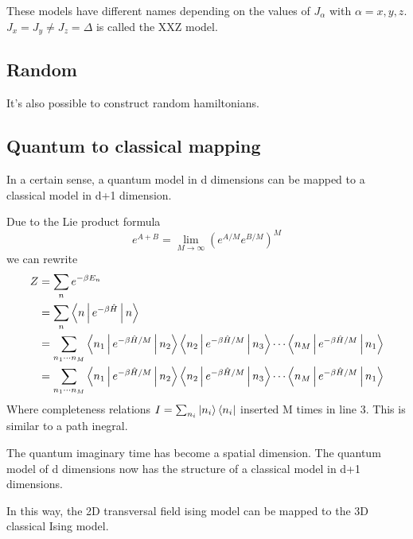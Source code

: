 These models have different names depending on the values of $J_{\alpha} $ with $\alpha=x,y,z$. $J_x = J_y \neq J_z = \Delta$ is called the XXZ model.

\subsection{Random}
It's also possible to construct random hamiltonians. 

\subsection{Quantum to classical mapping}

In a certain sense, a quantum model in d dimensions can be mapped to a classical model in d+1 dimension.

Due to the Lie product formula
\begin{equation}
    e^{A+B} = \lim_{M \to \infty } ( e^{A/M} e^{B/M}  )^M
\end{equation}
we can rewrite
\begin{equation}
    \begin{split}
        Z &= \sum_n e^{ - \beta E_n} \\
        &= \sum_n \Braket{n | e^{ - \beta \hat{H} }  | n} \\
        &= \sum_{n_1 \cdots n_M} \Braket{n_1 | e^{ - \beta \hat{H} /M}  | n_2}  \Braket{n_2 | e^{ - \beta \hat{H} /M }  | n_3} \cdots  \Braket{n_{M} | e^{ - \beta \hat{H} /M }  | n_1} \\
        &= \sum_{  n_1 \cdots n_M} \Braket{n_1 | e^{ - \beta \hat{H} /M}  | n_2}  \Braket{n_2 | e^{ - \beta \hat{H} /M }  | n_3} \cdots  \Braket{n_{M} | e^{ - \beta \hat{H} /M }  | n_1} \\
    \end{split}
\end{equation}
Where completeness relations $ I = \sum_{n_i}  \ket{ n_i } \bra{ n_i}  $ inserted M times in line 3. This is similar to a path inegral.

The quantum imaginary time has become a spatial dimension. The quantum model of d dimensions now has the structure of a classical model in d+1 dimensions.

In this way, the 2D transversal field ising model can be mapped to the 3D classical Ising model. \cite{Hsieh}